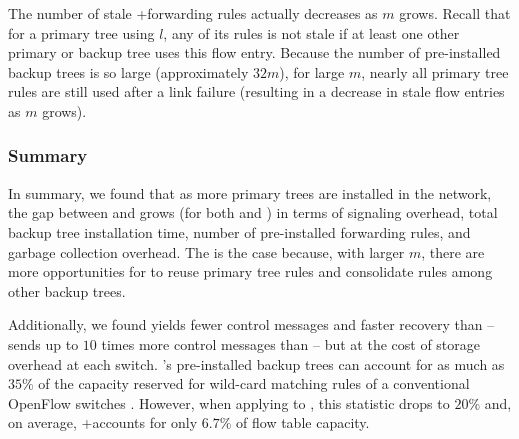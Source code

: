 The number of stale \pres+\merge forwarding rules actually decreases as $m$ grows.  
Recall that for a primary tree using $l$, any of its rules is not stale if at least one other primary or backup tree uses this flow entry. 
Because the number of pre-installed backup trees is so large (approximately $32m$), for large $m$, nearly all primary tree rules are still used after a link failure (resulting
in a decrease in stale flow entries as $m$ grows).



\subsubsection{Summary}

In summary, we found that as more primary trees are installed in the network, the gap between \merge and \base grows (for both \post and \pres) in terms of signaling overhead, 
total backup tree installation time, number of pre-installed forwarding rules, and garbage collection overhead.  The is the case 
because, with larger $m$, there are more opportunities for \merge to reuse primary tree rules and consolidate rules among other backup trees.

Additionally, we found \pre yields fewer control messages and faster recovery than \post -- \post sends up to $10$ times more control messages than \pre --
but at the cost of storage overhead at each switch. \pres's pre-installed backup trees can account for as much as $35\%$ of the capacity reserved for wild-card matching rules 
of a conventional OpenFlow switches \cite{Curtis11}. However, when applying \merge to \pres, this statistic drops to $20\%$ and, on average, \pres+\merge accounts for only $6.7\%$ of flow
table capacity.



